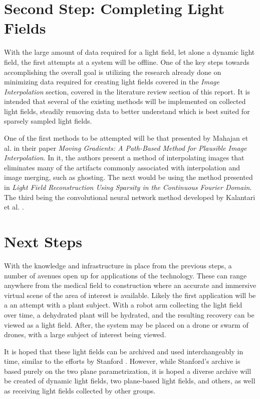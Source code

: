 \documentclass[12pt]{report}
\begin{document}
\section{Second Step: Completing Light Fields}
With the large amount of data required for a light field, let alone a dynamic light field, the first attempts at a system will be offline. One of the key steps towards accomplishing the overall goal is utilizing the research already done on minimizing data required for creating light fields covered in the \emph{Image Interpolation} section, covered in the literature review section of this report. It is intended that several of the existing methods will be implemented on collected light fields, steadily removing data to better understand which is best suited for sparsely sampled light fields.

One of the first methods to be attempted will be that presented by Mahajan et al. in their paper \emph{Moving Gradients: A Path-Based Method for Plausible Image Interpolation}. In it, the authors present a method of interpolating images that eliminates many of the artifacts commonly associated with interpolation and image merging, such as ghosting. The next would be using the method presented in \emph{Light Field Reconstruction Using Sparsity in the Continuous Fourier Domain}. The third being the convolutional neural network method developed by Kalantari et al. \cite{Kalantari16}.

\section{Next Steps}
With the knowledge and infrastructure in place from the previous steps, a number of avenues open up for applications of the technology. These can range anywhere from the medical field to construction where an accurate and immersive virtual scene of the area of interest is available. Likely the first application will be a an attempt with a plant subject. With a robot arm collecting the light field over time, a dehydrated plant will be hydrated, and the resulting recovery can be viewed as a light field. After, the system may be placed on a drone or swarm of drones, with a large subject of interest being viewed.

It is hoped that these light fields can be archived and used interchangeably in time, similar to the efforts by Stanford \cite{lfArchive}. However, while Stanford's archive is based purely on the two plane parametrization, it is hoped a diverse archive will be created of dynamic light fields, two plane-based light fields, and others, as well as receiving light fields collected by other groups.
\end{document}
